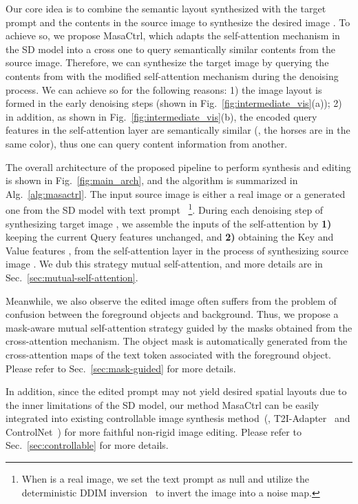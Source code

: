 \documentclass[10pt,twocolumn,letterpaper]{article}
\begin{document}
Our core idea is to combine the semantic layout synthesized with the target prompt  and the contents in the source image  to synthesize the desired image . 
To achieve so, we propose MasaCtrl, which adapts the self-attention mechanism in the SD model into a cross one to query semantically similar contents from the source image. Therefore, we can synthesize the target image  by querying the contents from  with the modified self-attention mechanism during the denoising process. We can achieve so for the following reasons: 1) the image layout is formed in the early denoising steps (shown in Fig.~\ref{fig:intermediate_vis}(a)); 2) in addition, as shown in Fig.~\ref{fig:intermediate_vis}(b), the encoded query features in the self-attention layer are semantically similar (\eg, the horses are in the same color), thus one can query content information from another.


The overall architecture of the proposed pipeline to perform synthesis and editing is shown in Fig.~\ref{fig:main_arch}, and the algorithm is summarized in Alg.~\ref{alg:masactrl}. The input source image  is either a real image or a generated one from the SD model with text prompt ~\footnote{When  is a real image, we set the text prompt  as null and utilize the deterministic DDIM inversion~\cite{song2020denoising} to invert the image into a noise map.}. During each denoising step  of synthesizing target image , we assemble the inputs of the self-attention by \textbf{1)} keeping the current Query features  unchanged, and \textbf{2)} obtaining the Key and Value features ,  from the self-attention layer in the process of synthesizing source image . We dub this strategy mutual self-attention, and more details are in Sec.~\ref{sec:mutual-self-attention}.

Meanwhile, we also observe the edited image often suffers from the problem of confusion between the foreground objects and background. Thus, we propose a mask-aware mutual self-attention strategy guided by the masks obtained from the cross-attention mechanism. The object mask is automatically generated from the cross-attention maps of the text token associated with the foreground object. Please refer to Sec.~\ref{sec:mask-guided} for more details.

In addition, since the edited prompt  may not yield desired spatial layouts due to the inner limitations of the SD model, our method MasaCtrl can be easily integrated into existing controllable image synthesis method~(\eg, T2I-Adapter~\cite{mou2023t2i} and ControlNet~\cite{zhang2023adding}) for more faithful non-rigid image editing. Please refer to Sec.~\ref{sec:controllable} for more details.
\end{document}

